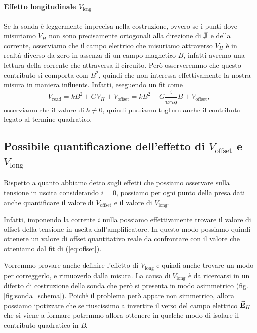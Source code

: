 \documentclass[fleqn,varvw,preprintnumbers,citeautoscript]{memo}
\newcommand\vlong{V_\text{long}}
\begin{document}
\paragraph{Effetto longitudinale $V_\text{long}$} Se la sonda è leggermente imprecisa nella costruzione, ovvero se i punti dove misuriamo $V_H$ non sono precisamente ortogonali alla direzione di $\va{J}$ e della corrente, osserviamo che il campo elettrico che misuriamo attraverso $V_H$ è in realtà diverso da zero in assenza di un campo magnetico $B$, infatti avremo una lettura della corrente che attraversa il circuito. Però osserveremmo che questo contributo si comporta com $B^2$, quindi che non interessa effettivamente la nostra misura in maniera influente. Infatti, eseguendo un fit come \begin{equation}
    V_\text{read} = kB^2 +  GV_H + V_\text{offset} = kB^2 + G\frac{i}{wnq}B + V_\text{offset},\label{eq:B2_dep}
\end{equation} osserviamo che il valore di $k\neq0$, quindi possiamo togliere anche il contributo legato al termine quadratico. 

\subsection{Possibile quantificazione dell'effetto di $V_\text{offset}$ e $V_\text{long}$}

 Rispetto a quanto abbiamo detto sugli effetti che possiamo osservare sulla tensione in uscita considerando $i=0$, possiamo per ogni punto della presa dati anche quantificare il valore di $V_\text{offset}$ e il valore di $V_\text{long}$. 

Infatti, imponendo la corrente $i$ nulla possiamo effettivamente trovare il valore di offset della tensione in uscita dall'amplificatore. In questo modo possiamo quindi ottenere un valore di offset quantitativo reale da confrontare con il valore che otteniamo dal fit di (\ref{eq:offset}). 

Vorremmo provare anche definire l'effetto di $\vlong$ e quindi anche trovare un modo per correggerlo, e rimuoverlo dalla misura. La causa di $\vlong$ è da ricercarsi in un difetto di costruzione della sonda che però si presenta in modo asimmetrico (fig. \ref{fig:sonda_schema}). Poichè il problema però appare non simmetrico, allora possiamo ipotizzare che se riuscissimo a invertire il verso del campo elettrico $\va{E}_H$ che si viene a formare potremmo allora ottenere in qualche modo di isolare il contributo quadratico in $B$. 
\end{document}
